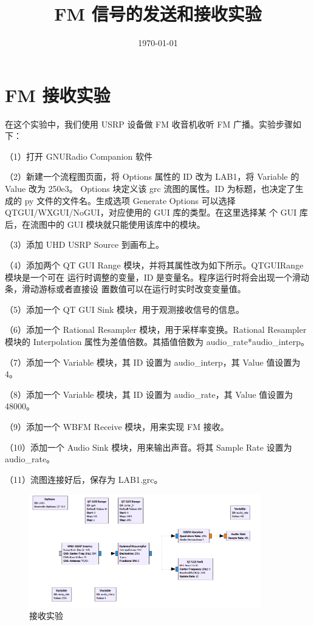 \documentclass{../source/Experiment}
\title{FM 信号的发送和接收实验}
\date{\today}
\begin{document}
\makecover
\makeheader
\section{FM 接收实验}
在这个实验中，我们使用 USRP 设备做 FM 收音机收听 FM 广播。实验步骤如下：

（1）打开 GNURadio Companion 软件

（2）新建一个流程图页面，将 Options 属性的 ID 改为 LAB1，将 Variable 的 Value 改为 250e3。 Options 块定义该 grc 流图的属性。ID 为标题，也决定了生成的 py 文件的文件名。生成选项 Generate Options 可以选择 QTGUI/WXGUI/NoGUI，对应使用的 GUI 库的类型。在这里选择某 个 GUI 库后，在流图中的 GUI 模块就只能使用该库中的模块。

（3）添加 UHD USRP Source 到画布上。

（4）添加两个 QT GUI Range 模块，并将其属性改为如下所示。QTGUIRange 模块是一个可在 运行时调整的变量，ID 是变量名。程序运行时将会出现一个滑动条，滑动游标或者直接设 置数值可以在运行时实时改变变量值。

（5）添加一个 QT GUI Sink 模块，用于观测接收信号的信息。

（6）添加一个 Rational Resampler 模块，用于采样率变换。Rational Resampler 模块的 Interpolation 属性为差值倍数。其插值倍数为 audio\_rate*audio\_interp。

（7）添加一个 Variable 模块，其 ID 设置为 audio\_interp，其 Value 值设置为 4。

（8）添加一个 Variable 模块，其 ID 设置为 audio\_rate，其 Value 值设置为 48000。

（9）添加一个 WBFM Receive 模块，用来实现 FM 接收。

（10）添加一个 Audio Sink 模块，用来输出声音。将其 Sample Rate 设置为 audio\_rate。

（11）流图连接好后，保存为 LAB1.grc。

\begin{figure}[H]
    \centering
    \includegraphics[width = 0.9\textwidth]{lab7/receive.png}
    \caption{接收实验}
\end{figure}
\end{document}
